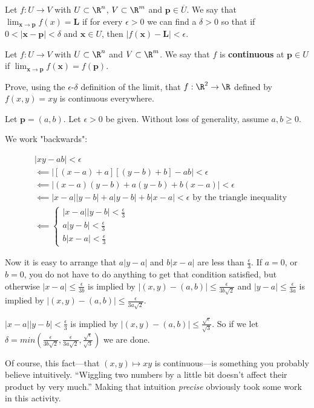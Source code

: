 \documentclass{ximera}
\begin{document}
\begin{definition}
	Let $f:U \to  V$  with $U \subset \R^n$, $V \subset \R^m$ and $\mathbf{p} \in \overline{U}$.  We say that $\lim_{\mathbf{x} \to \mathbf{p}}f(x) = \mathbf{L}$ if for every $\epsilon >0$ we can find a 
	$\delta>0$ so that if $0<|\mathbf{x}-\mathbf{p}|<\delta$ and $\mathbf{x} \in U$, then $|f(\mathbf{x})-\mathbf{L}|<\epsilon$.
\end{definition}

\begin{definition}
	 Let $f:U \to  V$  with $U \subset \R^n$ and $V \subset \R^m$.  We say that $f$ is \textbf{continuous} at $\mathbf{p} \in U$ if $\lim_{\mathbf{x} \to \mathbf{p}} f(\mathbf{x}) = f(\mathbf{p})$. 
\end{definition}

Prove, using the $\epsilon$-$\delta$ definition of the limit, that $f:\R^2 \to \R$ defined by $f(x,y) = xy$ is continuous everywhere.

\begin{free-response}
	Let $\mathbf{p} = (a,b)$.   Let $\epsilon>0$ be given.  Without loss of generality, assume $a,b \geq 0$.
	
	We work "backwards":
	
	\begin{align*}
		&|xy-ab|<\epsilon\\
		&\impliedby |[(x-a)+a][(y-b)+b]-ab| <\epsilon \\
		&\impliedby |(x-a)(y-b)+a(y-b) +b(x-a)| <\epsilon \\
		&\impliedby |x-a||y-b|+a|y-b|+b|x-a|< \epsilon \text{ by the triangle inequality}\\
		&\impliedby \begin{cases}
			|x-a||y-b| < \frac{\epsilon}{3}\\
			a|y-b| < \frac{\epsilon}{3}\\
			b|x-a| < \frac{\epsilon}{3}
			\end{cases}
	\end{align*}
	
	Now it is easy to arrange that $a|y-a|$  and $b|x-a|$ are less than $\frac{\epsilon}{3}$.  If $a=0$, or $b=0$, 
	you do not have to do anything to get that condition satisfied, but otherwise $|x-a| \leq \frac{\epsilon}{3b}$ is implied by $|(x,y) - (a,b)| \leq \frac{\epsilon}{3b\sqrt{2}}$
	and  $|y-a| \leq \frac{\epsilon}{3a}$ is implied by $|(x,y) - (a,b)| \leq \frac{\epsilon}{3a\sqrt{2}}$.
	
	$|x-a||y-b| < \frac{\epsilon}{3}$ is implied by $|(x,y)-(a,b)| \leq \frac{\sqrt{\epsilon}}{\sqrt{3}}$.  
	So if we let $\delta = min(\frac{\epsilon}{3b\sqrt{2}}, \frac{\epsilon}{3a\sqrt{2}}, \frac{\sqrt{\epsilon}}{\sqrt{3}})$ 
	we are done.
\end{free-response}

Of course, this fact---that $(x,y) \mapsto xy$ is continuous---is something you probably believe intuitively.  ``Wiggling two numbers by a little bit doesn't affect their product by very much.''  Making that intuition \textit{precise} obviously took some work in this activity.
\end{document}
